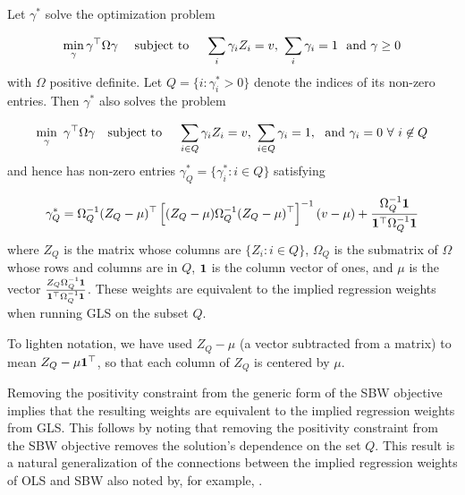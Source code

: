 \begin{proposition}\label{cl56}
Let $\gamma^*$ solve the optimization problem

\begin{equation}\label{eqn:a1.1}
 \min_\gamma \gamma^\top \Omega \gamma \quad \text{ subject to } \quad  \sum_i \gamma_i Z_i = v,\ \sum_i \gamma_i = 1 \ \textup{ and } \gamma \geq 0%
\end{equation}
with $\Omega$ positive definite. Let $Q = \{i: \gamma^*_i > 0\}$ denote the indices of its non-zero entries. Then $\gamma^*$ also solves the problem
  
  \begin{equation}\label{eqn:a1.2}
   \min_{\gamma}  \ \gamma^\top \Omega \gamma  \quad \textup{subject to }\quad \sum_{i \in Q} \gamma_i Z_i = v,\ \sum_{i \in Q} \gamma_i = 1,\ \textup{ and }   \gamma_i = 0\  \forall\ i \not\in Q
  \end{equation}
and hence has non-zero entries $\gamma^*_Q = \{\gamma_i^*: i \in Q\}$ satisfying
 
 \begin{equation}\label{eqn:a1.3}
 \gamma^*_{Q} = \Omega_{Q}^{-1} (Z_{Q} - \mu)^\top\left[ (Z_Q - \mu) \Omega_{Q}^{-1} (Z_Q - \mu)^\top\right]^{-1} (v - \mu) + \frac{\Omega^{-1}_Q {\bf 1} }{{\bf 1}^\top \Omega^{-1}_Q {\bf 1}}
 \end{equation}
where $Z_{Q}$ is the matrix whose columns are $\{Z_i: i \in Q\}$, $\Omega_Q$ is the submatrix of $\Omega$ whose rows and columns are in $Q$, ${\bf 1}$ is the column vector of ones, and $\mu$ is the vector $\frac{Z_{Q}\Omega_{Q}^{-1} {\bf 1}}{ {\bf 1}^\top \Omega^{-1}_Q {\bf 1}}$. These weights are equivalent to the implied regression weights when running GLS on the subset $Q$.
\end{proposition}

\begin{remark}
To lighten notation, we have used $Z_Q - \mu$ (a vector subtracted from a matrix) to mean $Z_Q - \mu{\bf 1}^\top$, so that each column of $Z_{Q}$ is centered by $\mu$. 
\end{remark}

\begin{remark}
Removing the positivity constraint from the generic form of the SBW objective implies that the resulting weights are equivalent to the implied regression weights from GLS. This follows by noting that removing the positivity constraint from the SBW objective removes the solution's dependence on the set $Q$. This result is a natural generalization of the connections between the implied regression weights of OLS and SBW also noted by, for example, \cite{chattopadhyay2021implied}.
\end{remark}

